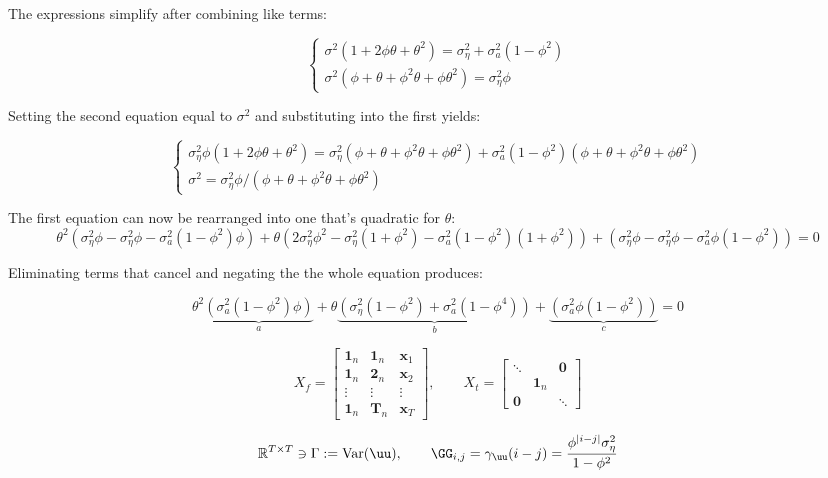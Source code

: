 The expressions simplify after combining like terms:

$$\begin{cases}
    \sigma^2(1  + 2\phi\theta + \theta^2) =  \sigma_\eta^2 + \sigma_a^2(1 - \phi ^ 2) \\
    \sigma^2(\phi  + \theta + \phi^2\theta + \phi\theta^2) = \sigma_\eta^2\phi
\end{cases} $$

Setting the second equation equal to $\sigma^2$ and substituting into the first yields:

$$\begin{cases}
    \sigma_\eta^2\phi   (1  + 2\phi\theta + \theta^2) =  \sigma_\eta^2(\phi  + \theta + \phi^2\theta + \phi\theta^2) + \sigma_a^2(1 - \phi ^ 2)(\phi  + \theta + \phi^2\theta + \phi\theta^2) \\
    \sigma^2 = \sigma_\eta^2\phi/(\phi  + \theta + \phi^2\theta + \phi\theta^2) 
\end{cases} $$

The first equation can now be rearranged into one that's quadratic for $\theta$:
$$ \theta^2(\sigma_\eta^2\phi - \sigma_\eta^2\phi - \sigma_a^2(1-\phi^2)\phi) + \theta(2\sigma_\eta^2\phi^2 - \sigma_\eta^2(1 + \phi^2) - \sigma_a^2(1-\phi^2)(1 +\phi^2)) + (\sigma_\eta^2\phi - \sigma_\eta^2\phi - \sigma_a^2\phi(1-\phi^2))
= 0 $$

Eliminating terms that cancel and negating the the whole equation produces:

$$ \theta^2 \underset{a}{\underbrace{( \sigma_a^2(1-\phi^2)\phi)}} + \theta \underset{b}{\underbrace{ (\sigma_\eta^2(1-\phi^2) + \sigma_a^2(1-\phi^4))}} + \underset{c}{\underbrace{( \sigma_a^2\phi(1-\phi^2))}}
= 0 $$

$$X_f = \left[\begin{array}{ccc}
    \mathbf{1}_n & \mathbf{1}_n & \mathbf{x}_1 \\
    \mathbf{1}_n & \mathbf{2}_n & \mathbf{x}_2 \\
    \vdots & \vdots & \vdots \\
    \mathbf{1}_n & \mathbf{T}_n & \mathbf{x}_T
    \end{array}\right] ,\qquad X_t = \left[\begin{array}{ccc}
    \ddots & & \mathbf{0}  \\
     & \mathbf{1}_n & \\
     \mathbf{0} & & \ddots
\end{array}\right] $$

\begin{equation}
    \label{eq:cov_u}
    \mathbb{R}^{T\times T} \ni\Gamma := \text{Var}(\uu), \qquad \GG_{i,j} = \gamma_\uu(i-j) = \frac{\phi^{|i-j|}\sigma_\eta^2}{1-\phi^2}
\end{equation}

